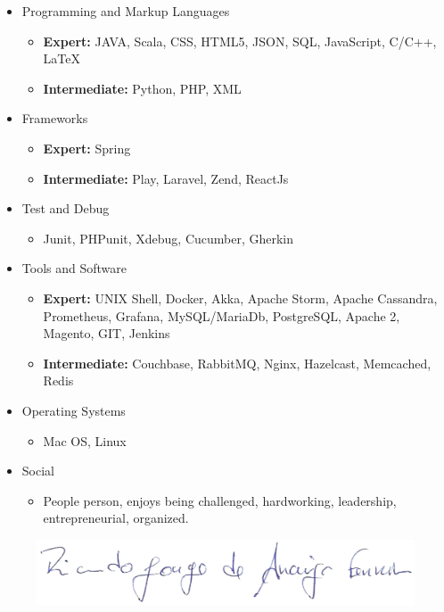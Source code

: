 \documentclass[letterpaper,11pt]{article}
\newcommand{\resitem}[1]{\item #1 \vspace{2pt}}
\begin{document}
\begin{itemize}
\item
	Programming and Markup Languages
	\begin{itemize}
		\resitem{{\bf Expert:}  JAVA, Scala, CSS, HTML5, JSON, SQL, JavaScript, C/C++, \LaTeX}
		\resitem{{\bf Intermediate:} Python, PHP, XML }
    \end{itemize}
\end{itemize} 
\hspace{20pt}
\begin{itemize}
\item
	Frameworks
	\begin{itemize}
		\resitem{{\bf Expert:} Spring}
		\resitem{{\bf Intermediate:} Play, Laravel, Zend, ReactJs}
	\end{itemize}
	
	\item
	Test and Debug
	\begin{itemize}
		\resitem{Junit, PHPunit, Xdebug, Cucumber, Gherkin}
	\end{itemize}

\item
	Tools and Software
	\begin{itemize}
		\resitem{{\bf Expert:} UNIX Shell, Docker, Akka, Apache Storm, Apache Cassandra, Prometheus, Grafana, MySQL/MariaDb, PostgreSQL, Apache 2, Magento, GIT, Jenkins}
		\resitem{{\bf Intermediate:} Couchbase, RabbitMQ, Nginx, Hazelcast, Memcached, Redis}
	\end{itemize}
	
	\item
	Operating Systems
	\begin{itemize}
		\resitem{Mac OS, Linux}
	\end{itemize}

	\item
	Social
	\begin{itemize}
		\resitem{People person, enjoys being challenged, hardworking, leadership, entrepreneurial, organized.}
	\end{itemize}
\end{itemize}



\vspace{5mm}

\begin{figure}[h]
\centering
{\includegraphics[scale=0.25]{img/sig.png}}
\end{figure}
\end{document}
